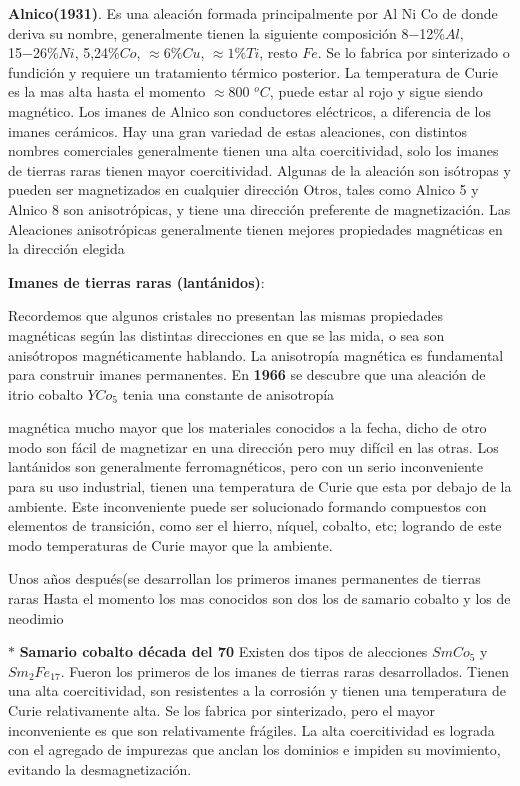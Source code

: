 \textbf{Alnico(1931)}. Es una aleación formada principalmente por Al Ni Co de donde deriva su nombre, generalmente tienen la siguiente composición 8−12\%$Al$, 15−26\%$Ni$, 5,24\%$Co$, $\approx 6 \% Cu$, $\approx 1 \% Ti$,  resto $Fe$. Se lo fabrica por sinterizado o fundición y requiere un tratamiento térmico posterior. La temperatura de Curie es la mas alta hasta el momento $\approx$800 ${^{o}C}$, puede estar al rojo y sigue siendo magnético. Los imanes de Alnico son conductores eléctricos, a diferencia de los imanes cerámicos. Hay una gran variedad de estas aleaciones, con distintos nombres comerciales generalmente tienen una alta coercitividad, solo los imanes de tierras raras tienen mayor coercitividad. Algunas de la aleación son isótropas y pueden ser magnetizados en cualquier dirección Otros, tales como Alnico 5 y Alnico 8 son anisotrópicas, y tiene una dirección preferente de magnetización. Las Aleaciones anisotrópicas generalmente tienen mejores propiedades magnéticas en la dirección elegida 

\textbf{Imanes de tierras raras (lantánidos)}:

Recordemos que algunos cristales no presentan las mismas propiedades magnéticas según las distintas direcciones en que se las mida, o sea son
anisótropos magnéticamente hablando. La anisotropía magnética es fundamental para construir imanes permanentes. En \textbf{1966} se descubre que una aleación de itrio cobalto $YCo_{5}$ tenia una constante de anisotropía 

magnética mucho mayor que los materiales conocidos a la fecha, dicho de otro modo son fácil de magnetizar en una dirección pero muy difícil en las otras. Los lantánidos son generalmente ferromagnéticos, pero con un serio inconveniente para su uso industrial, tienen una temperatura de Curie que esta por debajo de la ambiente. Este inconveniente puede ser solucionado formando compuestos con elementos de transición, como ser el hierro, níquel, cobalto, etc; logrando de este modo temperaturas de Curie mayor que la ambiente. 

Unos años después(se desarrollan los primeros imanes permanentes de tierras raras Hasta el momento los mas conocidos son dos los de samario cobalto y los de neodimio

$\ast$ \textbf{Samario cobalto década del 70} Existen dos tipos de alecciones $SmCo_{5}$ y $Sm_{2}Fe_{17}$. Fueron los primeros de los imanes de tierras raras desarrollados. Tienen una alta coercitividad, son resistentes a la corrosión y tienen una temperatura de Curie relativamente alta. Se los fabrica por sinterizado, pero el mayor inconveniente es que son relativamente frágiles. La alta coercitividad es lograda con el agregado de impurezas que
anclan los dominios e impiden su movimiento, evitando la desmagnetización.

